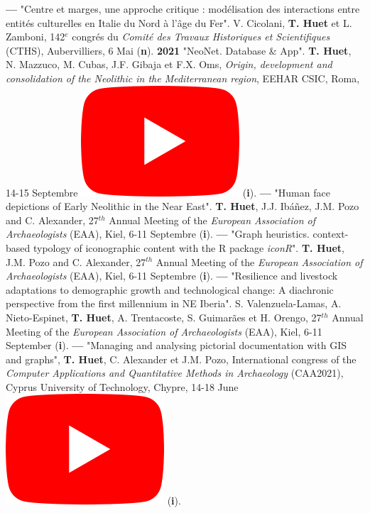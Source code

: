 \documentclass{article}
\begin{document}
{\textbf{--- }"Centre et marges, une approche critique : modélisation des interactions entre entités culturelles en Italie du Nord à l'âge du Fer". V. Cicolani, \textbf{T. Huet} et L. Zamboni, 142${}^{e}$ congr\'{e}s du \textit{Comit\'{e} des Travaux Historiques et Scientifiques} (CTHS), Aubervilliers, 6 Mai (\textbf{n}).
\smallbreak
\textbf{2021 }"NeoNet. Database \& App". \textbf{T. Huet}, N. Mazzuco, M. Cubas, J.F. Gibaja et F.X. Oms, \textit{Origin, development and consolidation of the Neolithic in the Mediterranean region}, EEHAR CSIC, Roma, 14-15 Septembre \href{https://youtu.be/GM2niot0XwE?t=10700}{\includegraphics[scale=0.2]{icon_youtube}} (\textbf{i}).
\smallbreak
\textbf{--- }"Human face depictions of Early Neolithic in the Near East". \textbf{T. Huet}, J.J. Ibáñez, J.M. Pozo and C. Alexander, 27${}^{th}$ Annual Meeting of the \textit{European Association of Archaeologists} (EAA), Kiel, 6-11 Septembre (\textbf{i}).
\smallbreak
\textbf{--- }"Graph heuristics. context-based typology of iconographic content with the R package \textit{iconR}". \textbf{T. Huet}, J.M. Pozo and C. Alexander, 27${}^{th}$ Annual Meeting of the \textit{European Association of Archaeologists} (EAA), Kiel, 6-11 Septembre (\textbf{i}).
\smallbreak
\textbf{--- }"Resilience and livestock adaptations to demographic growth and technological change: A diachronic perspective from the first millennium in NE Iberia". S. Valenzuela-Lamas, A. Nieto-Espinet, \textbf{T. Huet}, A. Trentacoste, S. Guimarães et H. Orengo, 27${}^{th}$ Annual Meeting of the \textit{European Association of Archaeologists} (EAA), Kiel, 6-11 September (\textbf{i}).
\smallbreak
\textbf{--- }"Managing and analysing pictorial documentation with GIS and graphs", \textbf{T. Huet}, C. Alexander et J.M. Pozo, International congress of the \textit{Computer Applications and Quantitative Methods in Archaeology} (CAA2021), Cyprus University of Technology, Chypre, 14-18 June \href{https://youtu.be/tUhHhzGSgbk?t=4950}{\includegraphics[scale=0.2]{icon_youtube}} (\textbf{i}).
}
\end{document}
